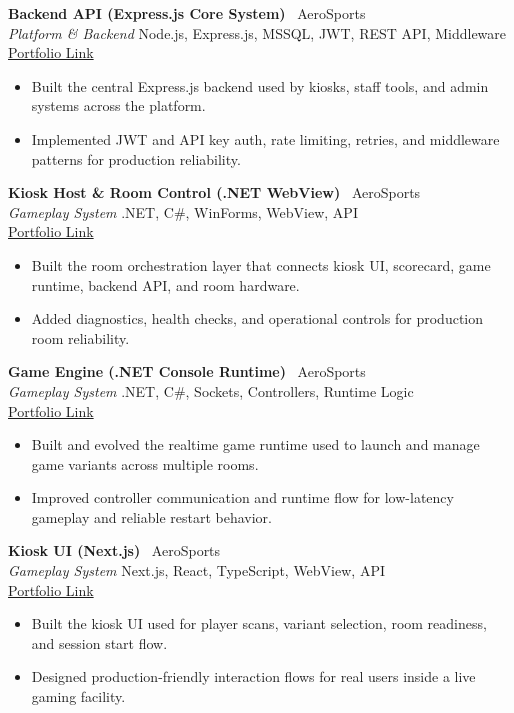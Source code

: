 \documentclass[a4paper,10pt]{article}
\begin{document}
\textbf{Backend API (Express.js Core System)} \textbar\ AeroSports \\
\textit{Platform \& Backend} \hfill Node.js, Express.js, MSSQL, JWT, REST API, Middleware
\\
\href{https://prabeshkunwar12.github.io/portfolio/developer/projects/backend-api-express}{Portfolio Link}
\begin{itemize}
    \item Built the central Express.js backend used by kiosks, staff tools, and admin systems across the platform.
    \item Implemented JWT and API key auth, rate limiting, retries, and middleware patterns for production reliability.
\end{itemize}
\textbf{Kiosk Host \& Room Control (.NET WebView)} \textbar\ AeroSports \\
\textit{Gameplay System} \hfill .NET, C\#, WinForms, WebView, API
\\
\href{https://prabeshkunwar12.github.io/portfolio/developer/projects/kiosk-host-dotnet}{Portfolio Link}
\begin{itemize}
    \item Built the room orchestration layer that connects kiosk UI, scorecard, game runtime, backend API, and room hardware.
    \item Added diagnostics, health checks, and operational controls for production room reliability.
\end{itemize}
\textbf{Game Engine (.NET Console Runtime)} \textbar\ AeroSports \\
\textit{Gameplay System} \hfill .NET, C\#, Sockets, Controllers, Runtime Logic
\\
\href{https://prabeshkunwar12.github.io/portfolio/developer/projects/game-engine-dotnet}{Portfolio Link}
\begin{itemize}
    \item Built and evolved the realtime game runtime used to launch and manage game variants across multiple rooms.
    \item Improved controller communication and runtime flow for low-latency gameplay and reliable restart behavior.
\end{itemize}
\textbf{Kiosk UI (Next.js)} \textbar\ AeroSports \\
\textit{Gameplay System} \hfill Next.js, React, TypeScript, WebView, API
\\
\href{https://prabeshkunwar12.github.io/portfolio/developer/projects/kiosk-ui-nextjs}{Portfolio Link}
\begin{itemize}
    \item Built the kiosk UI used for player scans, variant selection, room readiness, and session start flow.
    \item Designed production-friendly interaction flows for real users inside a live gaming facility.
\end{itemize}
\end{document}
